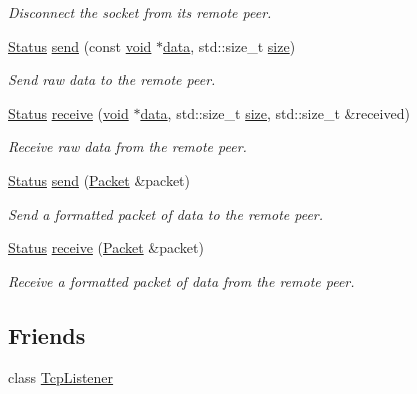 \begin{DoxyCompactItemize}
\begin{DoxyCompactList}\small\item\em Disconnect the socket from its remote peer. \end{DoxyCompactList}\item 
\hyperlink{classsf_1_1_socket_a51bf0fd51057b98a10fbb866246176dc}{Status} \hyperlink{classsf_1_1_tcp_socket_affce26ab3bcc4f5b9269dad79db544c0}{send} (const \hyperlink{glutf90_8h_ac778d6f63f1aaf8ebda0ce6ac821b56e}{void} $\ast$\hyperlink{gl3_8h_a0f78eecb0891cce3bdfc815b971866a1}{data}, std\-::size\-\_\-t \hyperlink{gl3_8h_a79ef9eb3e59c4bb34c4b9fbeb8d28ff7}{size})
\begin{DoxyCompactList}\small\item\em Send raw data to the remote peer. \end{DoxyCompactList}\item 
\hyperlink{classsf_1_1_socket_a51bf0fd51057b98a10fbb866246176dc}{Status} \hyperlink{classsf_1_1_tcp_socket_a90ce50811ea61d4f00efc62bb99ae1af}{receive} (\hyperlink{glutf90_8h_ac778d6f63f1aaf8ebda0ce6ac821b56e}{void} $\ast$\hyperlink{gl3_8h_a0f78eecb0891cce3bdfc815b971866a1}{data}, std\-::size\-\_\-t \hyperlink{gl3_8h_a79ef9eb3e59c4bb34c4b9fbeb8d28ff7}{size}, std\-::size\-\_\-t \&received)
\begin{DoxyCompactList}\small\item\em Receive raw data from the remote peer. \end{DoxyCompactList}\item 
\hyperlink{classsf_1_1_socket_a51bf0fd51057b98a10fbb866246176dc}{Status} \hyperlink{classsf_1_1_tcp_socket_a0f8276e2b1c75aac4a7b0a707b250f44}{send} (\hyperlink{classsf_1_1_packet}{Packet} \&packet)
\begin{DoxyCompactList}\small\item\em Send a formatted packet of data to the remote peer. \end{DoxyCompactList}\item 
\hyperlink{classsf_1_1_socket_a51bf0fd51057b98a10fbb866246176dc}{Status} \hyperlink{classsf_1_1_tcp_socket_aa655352609bc9804f2baa020df3e7331}{receive} (\hyperlink{classsf_1_1_packet}{Packet} \&packet)
\begin{DoxyCompactList}\small\item\em Receive a formatted packet of data from the remote peer. \end{DoxyCompactList}\end{DoxyCompactItemize}
\subsection*{Friends}
\begin{DoxyCompactItemize}
\item 
class \hyperlink{classsf_1_1_tcp_socket_a2b2dd140834917bd44b512236bddea7c}{Tcp\-Listener}
\end{DoxyCompactItemize}
